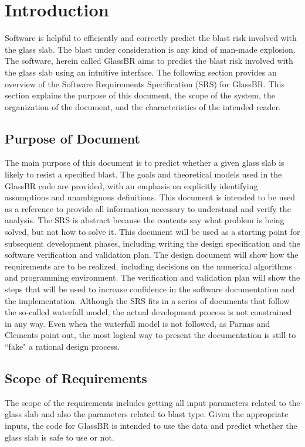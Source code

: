 \documentclass[12pt]{article}
\begin{document}
\section{Introduction}
\label{Sec:Intr}
Software is helpful to efficiently and correctly predict the blast risk involved with the glass slab. The blast under consideration is any kind of man-made explosion. The software, herein called GlassBR aims to predict the blast risk involved with the glass slab using an intuitive interface.
The following section provides an overview of the Software Requirements Specification (SRS) for GlassBR. This section explains the purpose of this document, the scope of the system, the organization of the document, and the characteristics of the intended reader.
\subsection{Purpose of Document}
\label{Sec:PurpofDocu}
The main purpose of this document is to predict whether a given glass slab is likely to resist a specified blast. The goals and theoretical models used in the GlassBR code are provided, with an emphasis on explicitly identifying assumptions and unambiguous definitions. This document is intended to be used as a reference to provide all information necessary to understand and verify the analysis. The SRS is abstract because the contents say what problem is being solved, but not how to solve it.
This document will be used as a starting point for subsequent development phases, including writing the design specification and the software verification and validation plan. The design document will show how the requirements are to be realized, including decisions on the numerical algorithms and programming environment. The verification and validation plan will show the steps that will be used to increase confidence in the software documentation and the implementation. Although the SRS fits in a series of documents that follow the so-called waterfall model, the actual development process is not constrained in any way. Even when the waterfall model is not followed, as Parnas and Clements point out, the most logical way to present the documentation is still to ``fake" a rational design process.
\subsection{Scope of Requirements}
\label{Sec:ScopofRequ}
The scope of the requirements includes getting all input parameters related to the glass slab and also the parameters related to blast type. Given the appropriate inputs, the code for GlassBR is intended to use the data and predict whether the glass slab is safe to use or not.
\end{document}
